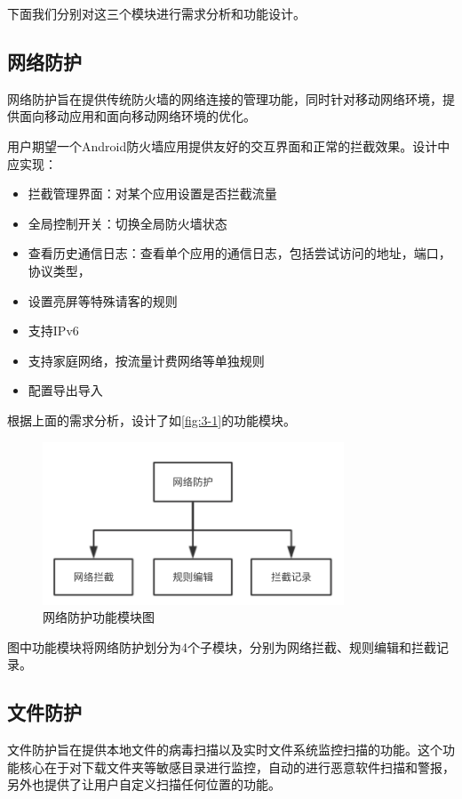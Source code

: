 \documentclass[format=final, language=chinese, degree=fyp]{hustthesis}
\begin{document}
下面我们分别对这三个模块进行需求分析和功能设计。

\subsection{网络防护}

网络防护旨在提供传统防火墙的网络连接的管理功能，同时针对移动网络环境，提供面向移动应用和面向移动网络环境的优化。

用户期望一个Android防火墙应用提供友好的交互界面和正常的拦截效果。设计中应实现：
\begin{itemize}
    \item 拦截管理界面：对某个应用设置是否拦截流量
    \item 全局控制开关：切换全局防火墙状态
    \item 查看历史通信日志：查看单个应用的通信日志，包括尝试访问的地址，端口，协议类型，
    \item 设置亮屏等特殊请客的规则
    \item 支持IPv6
    \item 支持家庭网络，按流量计费网络等单独规则
    \item 配置导出导入
\end{itemize}

根据上面的需求分析，设计了如\autoref{fig:3-1}的功能模块。
\begin{figure}[!h]
	\centering
	\includegraphics[width=0.8\textwidth]{function_1.png}
	\caption{网络防护功能模块图}\label{fig:3-1}
\end{figure}

图中功能模块将网络防护划分为4个子模块，分别为网络拦截、规则编辑和拦截记录。

\subsection{文件防护}

文件防护旨在提供本地文件的病毒扫描以及实时文件系统监控扫描的功能。这个功能核心在于对下载文件夹等敏感目录进行监控，自动的进行恶意软件扫描和警报，另外也提供了让用户自定义扫描任何位置的功能。
\end{document}
